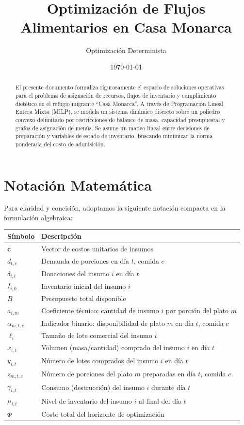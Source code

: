 \documentclass[12pt, a4paper]{article}
\title{\textbf{Optimización de Flujos Alimentarios en Casa Monarca}}
\author{Optimización Determinista}
\date{\today}
\begin{document}
\maketitle

\begin{abstract}
El presente documento formaliza rigurosamente el espacio de soluciones operativas para el problema de asignación de recursos, flujos de inventario y cumplimiento dietético en el refugio migrante ``Casa Monarca''. A través de Programación Lineal Entera Mixta (MILP), se modela un sistema dinámico discreto sobre un poliedro convexo delimitado por restricciones de balance de masa, capacidad presupuestal y grafos de asignación de menús. Se asume un mapeo lineal entre decisiones de preparación y variables de estado de inventario, buscando minimizar la norma ponderada del costo de adquisición.
\end{abstract}

\section{Notación Matemática}

Para claridad y concisión, adoptamos la siguiente notación compacta en la formulación algebraica:

\begin{table}[h]
\centering
\small
\begin{tabular}{ll}
\toprule
\textbf{Símbolo} & \textbf{Descripción} \\
\midrule
$\mathbf{c}$ & Vector de costos unitarios de insumos \\
$d_{t,c}$ & Demanda de porciones en día $t$, comida $c$ \\
$\delta_{i,t}$ & Donaciones del insumo $i$ en día $t$ \\
$I_{i,0}$ & Inventario inicial del insumo $i$ \\
$B$ & Presupuesto total disponible \\
$a_{i,m}$ & Coeficiente técnico: cantidad de insumo $i$ por porción del plato $m$ \\
$\alpha_{m,t,c}$ & Indicador binario: disponibilidad de plato $m$ en día $t$, comida $c$ \\
$\ell_i$ & Tamaño de lote comercial del insumo $i$ \\
\midrule
$x_{i,t}$ & Volumen (masa/cantidad) comprado del insumo $i$ en día $t$ \\
$y_{i,t}$ & Número de lotes comprados del insumo $i$ en día $t$ \\
$z_{m,t,c}$ & Número de porciones del plato $m$ preparadas en día $t$, comida $c$ \\
$\gamma_{i,t}$ & Consumo (destrucción) del insumo $i$ durante día $t$ \\
$\mu_{i,t}$ & Nivel de inventario del insumo $i$ al final del día $t$ \\
$\Phi$ & Costo total del horizonte de optimización \\
\bottomrule
\end{tabular}
\end{table}
\end{document}
